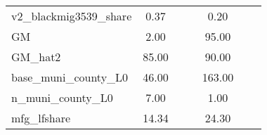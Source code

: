 \begin{table}[htbp]
\begin{tabular}{l*{2}{ccc}}
v2\_blackmig3539\_share&        0.37&            &            &        0.20&            &            \\
GM                  &        2.00&            &            &       95.00&            &            \\
GM\_hat2             &       85.00&            &            &       90.00&            &            \\
base\_muni\_county\_L0 &       46.00&            &            &      163.00&            &            \\
n\_muni\_county\_L0    &        7.00&            &            &        1.00&            &            \\
mfg\_lfshare         &       14.34&            &            &       24.30&            &            \\
\bottomrule
\end{tabular}
\end{table}
